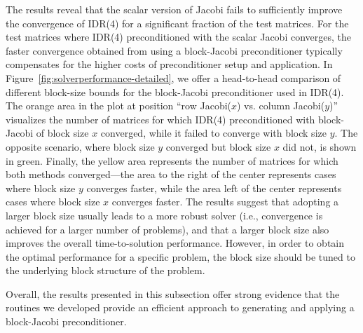 The results reveal that the scalar version of Jacobi fails to sufficiently
improve the convergence of IDR(4) for a significant fraction of the test
matrices.
For the test matrices where IDR(4) preconditioned with the scalar Jacobi
converges, the faster convergence obtained from using a block-Jacobi
preconditioner typically compensates for the higher costs of preconditioner
setup and application.
In Figure~\ref{fig:solverperformance-detailed}, we offer a
head-to-head comparison of different block-size bounds for the
block-Jacobi preconditioner used in IDR(4).
The orange area in the plot at position ``row Jacobi($x$) vs. column 
Jacobi($y$)'' 
visualizes the number of matrices for which IDR(4) preconditioned with 
block-Jacobi of block size $x$ converged, while it failed to converge with block size $y$. 
The opposite scenario, where block size $y$ converged
but block size $x$ did not, is shown in green. Finally, the yellow area 
represents the
number of matrices for which both methods converged---the area to the right of 
the center represents cases where block size $y$ converges faster, while the
area left of the center represents cases where block size $x$ converges faster. 
The results suggest that adopting a larger block size usually leads to a more robust solver
(i.e., convergence is achieved for a larger number of problems), and that a
larger block size also improves the overall time-to-solution performance.
However, in order to obtain the optimal performance for a specific problem, the
block size should be tuned to the underlying block structure of the problem.

Overall, the results presented in this subsection offer strong evidence that the
routines we developed
provide an efficient approach to generating and applying a block-Jacobi
preconditioner.

